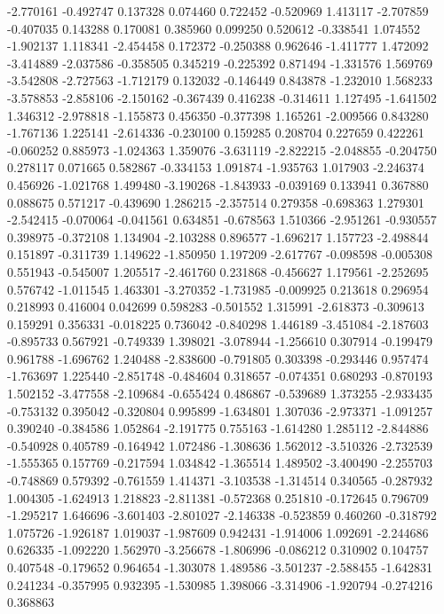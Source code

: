 -2.770161
-0.492747
0.137328
0.074460
0.722452
-0.520969
1.413117
-2.707859
-0.407035
0.143288
0.170081
0.385960
0.099250
0.520612
-0.338541
1.074552
-1.902137
1.118341
-2.454458
0.172372
-0.250388
0.962646
-1.411777
1.472092
-3.414889
-2.037586
-0.358505
0.345219
-0.225392
0.871494
-1.331576
1.569769
-3.542808
-2.727563
-1.712179
0.132032
-0.146449
0.843878
-1.232010
1.568233
-3.578853
-2.858106
-2.150162
-0.367439
0.416238
-0.314611
1.127495
-1.641502
1.346312
-2.978818
-1.155873
0.456350
-0.377398
1.165261
-2.009566
0.843280
-1.767136
1.225141
-2.614336
-0.230100
0.159285
0.208704
0.227659
0.422261
-0.060252
0.885973
-1.024363
1.359076
-3.631119
-2.822215
-2.048855
-0.204750
0.278117
0.071665
0.582867
-0.334153
1.091874
-1.935763
1.017903
-2.246374
0.456926
-1.021768
1.499480
-3.190268
-1.843933
-0.039169
0.133941
0.367880
0.088675
0.571217
-0.439690
1.286215
-2.357514
0.279358
-0.698363
1.279301
-2.542415
-0.070064
-0.041561
0.634851
-0.678563
1.510366
-2.951261
-0.930557
0.398975
-0.372108
1.134904
-2.103288
0.896577
-1.696217
1.157723
-2.498844
0.151897
-0.311739
1.149622
-1.850950
1.197209
-2.617767
-0.098598
-0.005308
0.551943
-0.545007
1.205517
-2.461760
0.231868
-0.456627
1.179561
-2.252695
0.576742
-1.011545
1.463301
-3.270352
-1.731985
-0.009925
0.213618
0.296954
0.218993
0.416004
0.042699
0.598283
-0.501552
1.315991
-2.618373
-0.309613
0.159291
0.356331
-0.018225
0.736042
-0.840298
1.446189
-3.451084
-2.187603
-0.895733
0.567921
-0.749339
1.398021
-3.078944
-1.256610
0.307914
-0.199479
0.961788
-1.696762
1.240488
-2.838600
-0.791805
0.303398
-0.293446
0.957474
-1.763697
1.225440
-2.851748
-0.484604
0.318657
-0.074351
0.680293
-0.870193
1.502152
-3.477558
-2.109684
-0.655424
0.486867
-0.539689
1.373255
-2.933435
-0.753132
0.395042
-0.320804
0.995899
-1.634801
1.307036
-2.973371
-1.091257
0.390240
-0.384586
1.052864
-2.191775
0.755163
-1.614280
1.285112
-2.844886
-0.540928
0.405789
-0.164942
1.072486
-1.308636
1.562012
-3.510326
-2.732539
-1.555365
0.157769
-0.217594
1.034842
-1.365514
1.489502
-3.400490
-2.255703
-0.748869
0.579392
-0.761559
1.414371
-3.103538
-1.314514
0.340565
-0.287932
1.004305
-1.624913
1.218823
-2.811381
-0.572368
0.251810
-0.172645
0.796709
-1.295217
1.646696
-3.601403
-2.801027
-2.146338
-0.523859
0.460260
-0.318792
1.075726
-1.926187
1.019037
-1.987609
0.942431
-1.914006
1.092691
-2.244686
0.626335
-1.092220
1.562970
-3.256678
-1.806996
-0.086212
0.310902
0.104757
0.407548
-0.179652
0.964654
-1.303078
1.489586
-3.501237
-2.588455
-1.642831
0.241234
-0.357995
0.932395
-1.530985
1.398066
-3.314906
-1.920794
-0.274216
0.368863

